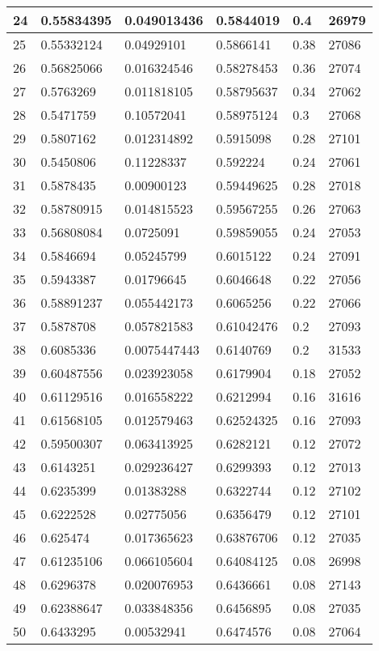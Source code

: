 \begin{longtable}{|l|l|l|l|l|l|}
24 & 0.55834395 & 0.049013436 & 0.5844019 & 0.4 & 26979 \\ \hline 
25 & 0.55332124 & 0.04929101 & 0.5866141 & 0.38 & 27086 \\ \hline 
26 & 0.56825066 & 0.016324546 & 0.58278453 & 0.36 & 27074 \\ \hline 
27 & 0.5763269 & 0.011818105 & 0.58795637 & 0.34 & 27062 \\ \hline 
28 & 0.5471759 & 0.10572041 & 0.58975124 & 0.3 & 27068 \\ \hline 
29 & 0.5807162 & 0.012314892 & 0.5915098 & 0.28 & 27101 \\ \hline 
30 & 0.5450806 & 0.11228337 & 0.592224 & 0.24 & 27061 \\ \hline 
31 & 0.5878435 & 0.00900123 & 0.59449625 & 0.28 & 27018 \\ \hline 
32 & 0.58780915 & 0.014815523 & 0.59567255 & 0.26 & 27063 \\ \hline 
33 & 0.56808084 & 0.0725091 & 0.59859055 & 0.24 & 27053 \\ \hline 
34 & 0.5846694 & 0.05245799 & 0.6015122 & 0.24 & 27091 \\ \hline 
35 & 0.5943387 & 0.01796645 & 0.6046648 & 0.22 & 27056 \\ \hline 
36 & 0.58891237 & 0.055442173 & 0.6065256 & 0.22 & 27066 \\ \hline 
37 & 0.5878708 & 0.057821583 & 0.61042476 & 0.2 & 27093 \\ \hline 
38 & 0.6085336 & 0.0075447443 & 0.6140769 & 0.2 & 31533 \\ \hline 
39 & 0.60487556 & 0.023923058 & 0.6179904 & 0.18 & 27052 \\ \hline 
40 & 0.61129516 & 0.016558222 & 0.6212994 & 0.16 & 31616 \\ \hline 
41 & 0.61568105 & 0.012579463 & 0.62524325 & 0.16 & 27093 \\ \hline 
42 & 0.59500307 & 0.063413925 & 0.6282121 & 0.12 & 27072 \\ \hline 
43 & 0.6143251 & 0.029236427 & 0.6299393 & 0.12 & 27013 \\ \hline 
44 & 0.6235399 & 0.01383288 & 0.6322744 & 0.12 & 27102 \\ \hline 
45 & 0.6222528 & 0.02775056 & 0.6356479 & 0.12 & 27101 \\ \hline 
46 & 0.625474 & 0.017365623 & 0.63876706 & 0.12 & 27035 \\ \hline 
47 & 0.61235106 & 0.066105604 & 0.64084125 & 0.08 & 26998 \\ \hline 
48 & 0.6296378 & 0.020076953 & 0.6436661 & 0.08 & 27143 \\ \hline 
49 & 0.62388647 & 0.033848356 & 0.6456895 & 0.08 & 27035 \\ \hline 
50 & 0.6433295 & 0.00532941 & 0.6474576 & 0.08 & 27064 \\ \hline 
\end{longtable}